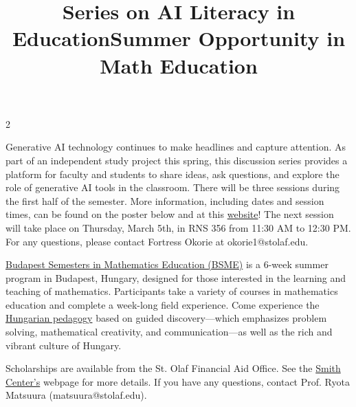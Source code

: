 \documentclass[12pt]{article}
\newcommand{\bolder}{\textbf}
\begin{document}
\begin{multicols}{2}
 \begin{tcolorbox}[colback=white, colframe=black]
    \begin{center}
    \title{{\large \bolder{Series on AI Literacy in Education}}}
    \end{center}
\end{tcolorbox}
Generative AI technology continues to make headlines and capture attention. As part of an independent study project this spring, this discussion series provides a platform for faculty and students to share ideas, ask questions, and explore the role of generative AI tools in the classroom. There will be three sessions during the first half of the semester. More information, including dates and session times, can be found on the poster below and at this \href{https://fortressokorie.github.io/ai_literacy/} {website}! The next session will take place on Thursday, March 5th, in RNS 356 from 11:30 AM to 12:30 PM. For any questions, please contact Fortress Okorie at okorie1@stolaf.edu.

\begin{tcolorbox}[colback=white, colframe=black]
    \begin{center}
    \title{{\large \bolder{Summer Opportunity in Math Education}}}
    \end{center}
\end{tcolorbox}

\href {https://bsmeducation.com} {Budapest Semesters in Mathematics Education (BSME)} is a 6-week summer program in Budapest, Hungary, designed for those interested in the learning and teaching of mathematics. Participants take a variety of courses in mathematics education and complete a week-long field experience. Come experience the \href{https://bsmeducation.com/wp-content/uploads/2020/02/hungarian-pedagogy-flyer.pdf}{Hungarian pedagogy} based on guided discovery—which emphasizes problem solving, mathematical creativity, and communication—as well as the rich and vibrant culture of Hungary.

Scholarships are available from the St. Olaf Financial Aid Office. See the \href{https://wp.stolaf.edu/smithcenter/st-olaf-summer-programs/#:~:text=All%20students%20are%20automatically%20considered%20for%20a%20need%2Dbased%20scholarship%20(see%20J%2DTerm%20column)%20of%20up%20to%2050%25%20of%20program%20costs%20from%20the%20St.%20Olaf%20Financial%20Aid%20Office.%C2%A0%C2%A0}{Smith Center's} webpage for more details. If you have any questions, contact Prof. Ryota Matsuura (matsuura@stolaf.edu).


\end{multicols}
\end{document}
